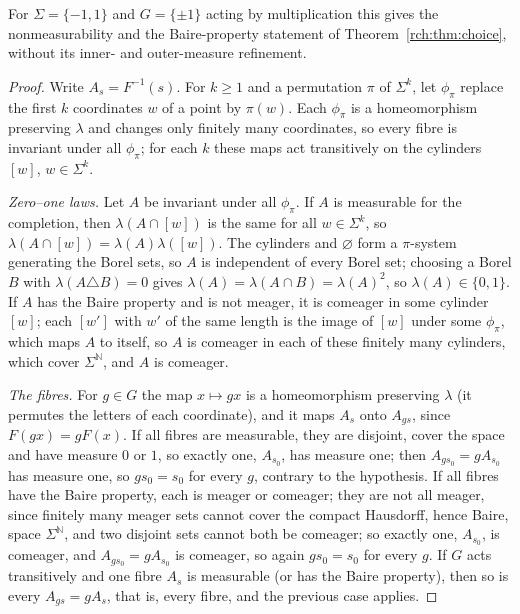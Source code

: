 \documentclass[11pt]{article}
\theoremstyle{definition}
\theoremstyle{remark}
\newcommand{\N}{\mathbb N}
\begin{document}
For $\Sigma=\{-1,1\}$ and $G=\{\pm1\}$ acting by multiplication this gives
the nonmeasurability and the Baire-property statement of
Theorem~\ref{rch:thm:choice}, without its inner- and outer-measure
refinement.

\begin{proof}
Write $A_s=F^{-1}(s)$. For $k\ge1$ and a permutation $\pi$ of $\Sigma^k$, let
$\phi_\pi$ replace the first $k$ coordinates $w$ of a point by $\pi(w)$.
Each $\phi_\pi$ is a homeomorphism preserving $\lambda$ and changes only
finitely many coordinates, so every fibre is invariant under all
$\phi_\pi$; for each $k$ these maps act transitively on the cylinders
$[w]$, $w\in\Sigma^k$.

\emph{Zero--one laws.} Let $A$ be invariant under all $\phi_\pi$. If $A$ is
measurable for the completion, then $\lambda(A\cap[w])$ is the same for all
$w\in\Sigma^k$, so $\lambda(A\cap[w])=\lambda(A)\lambda([w])$. The
cylinders and $\varnothing$ form a $\pi$-system generating the Borel sets,
so $A$ is independent of every Borel set; choosing a Borel $B$ with
$\lambda(A\triangle B)=0$ gives $\lambda(A)=\lambda(A\cap B)=\lambda(A)^2$,
so $\lambda(A)\in\{0,1\}$. If $A$ has the Baire property and is not meager,
it is comeager in some cylinder $[w]$; each $[w']$ with $w'$ of the same
length is the image of $[w]$ under some $\phi_\pi$, which maps $A$ to
itself, so $A$ is comeager in each of these finitely many cylinders, which
cover $\Sigma^{\N}$, and $A$ is comeager.

\emph{The fibres.} For $g\in G$ the map $x\mapsto gx$ is a homeomorphism
preserving $\lambda$ (it permutes the letters of each coordinate), and it
maps $A_s$ onto $A_{gs}$, since $F(gx)=gF(x)$. If all fibres are
measurable, they are disjoint, cover the space and have measure $0$ or $1$,
so exactly one, $A_{s_0}$, has measure one; then $A_{gs_0}=gA_{s_0}$ has
measure one, so $gs_0=s_0$ for every $g$, contrary to the hypothesis. If all
fibres have the Baire property, each is meager or comeager; they are not all
meager, since finitely many meager sets cannot cover the compact Hausdorff,
hence Baire, space $\Sigma^{\N}$, and two disjoint sets cannot both be
comeager; so exactly one, $A_{s_0}$, is comeager, and
$A_{gs_0}=gA_{s_0}$ is comeager, so again $gs_0=s_0$ for every $g$. If $G$
acts transitively and one fibre $A_s$ is measurable (or has the Baire
property), then so is every $A_{gs}=gA_s$, that is, every fibre, and the
previous case applies.
\end{proof}
\end{document}
